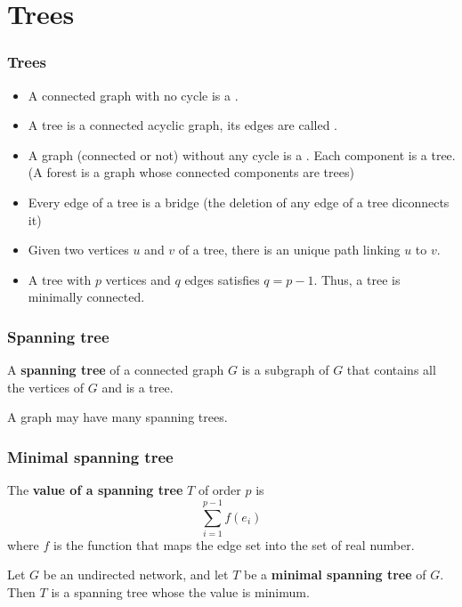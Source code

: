 \documentclass[aspectratio=169]{beamer}
\begin{document}
\section{Trees}

\begin{frame}\frametitle{Trees}
	\begin{definition}
	\begin{itemize}
	\item A connected graph with no cycle is a .
	\item A tree is a connected acyclic graph, its edges are called .
	\item A graph (connected or not) without any cycle is a . Each component is a tree. (A forest is a graph whose connected components are trees)
	\end{itemize}
	\end{definition}

	\begin{theorem}[{Properties}]
	\begin{itemize}
	\item Every edge of a tree is a bridge (the deletion of any edge of a tree diconnects it)
	\item Given two vertices $u $ and $v$ of a tree, there is an unique path linking $u$ to $v$.
	\item A tree with $p$ vertices and $q$ edges satisfies $q=p-1$. Thus, a tree is minimally connected. 
	\end{itemize}
	\end{theorem}
\end{frame}


\begin{frame}\frametitle{Spanning tree}
	\begin{definition}
	A \textbf{spanning tree} of a connected graph $G$ is a subgraph of $G$ that contains all the vertices of $G$ and is a tree.
	\end{definition}
	A graph may have many spanning trees.
\end{frame}


\begin{frame}\frametitle{Minimal spanning tree}
	\begin{definition}
	The \textbf{value of a spanning tree} $T$ of order $p$ is
	$$\sum_{i=1}^{p-1}f(e_i)$$
	where $f$ is the function that maps the edge set into the set of real number.
	\end{definition}
	\begin{definition}
	Let $G$ be an undirected network, and let $T$ be a \textbf{minimal spanning tree} of $G$. Then $T$ is a spanning tree whose the value is minimum.
	\end{definition}
\end{frame}
\end{document}
